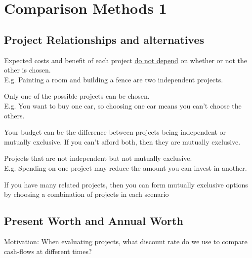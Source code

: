 \chapter{Comparison Methods 1}

\section{Project Relationships and alternatives}

\begin{definition}
    Expected costs and benefit of each project \underline{do not depend} on whether or not the other is chosen.\\
    E.g. Painting a room and building a fence are two independent projects.
\end{definition}

\begin{definition}
    Only one of the possible projects can be chosen.\\
    E.g. You want to buy one car, so choosing one car means you can't choose the others.
\end{definition}

\begin{remark}
    Your budget can be the difference between projects being independent or mutually exclusive. If you can't afford both, then they are mutually exclusive.
\end{remark}

\begin{definition}
    Projects that are not independent but not mutually exclusive.\\
    E.g. Spending on one project may reduce the amount you can invest in another.
\end{definition}

\begin{theorem}
    If you have many related projects, then you can form mutually exclusive options by choosing a combination of projects in each scenario
\end{theorem}

\section{Present Worth and Annual Worth}

\begin{remark}
    Motivation: When evaluating projects, what discount rate do we use to compare cash-flows at different times?
\end{remark}

